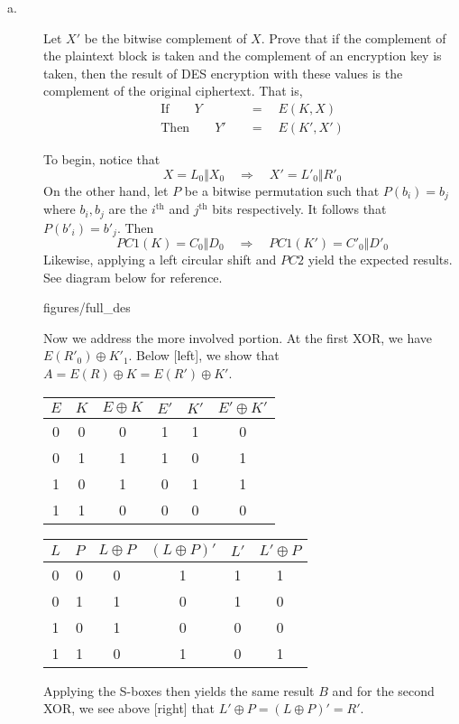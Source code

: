 \documentclass[../hw_sols.tex]{subfiles}
\begin{document}
\begin{description}

\item[a.] Let $X'$ be the bitwise complement of $X$. Prove that if the 
complement of the plaintext block is taken and the complement of an 
encryption key is taken, then the result of DES encryption with these values 
is the complement of the original ciphertext. That is,
\begin{align*}
	\text{If} \qquad Y \quad &= \quad E(K, X) \\
	\text{Then} \qquad Y' \quad &= \quad E(K', X')
\end{align*}

\begin{solution}

To begin, notice that 
	\[ X = L_0 \Vert X_0 \quad \Rightarrow \quad X' = L'_0 \Vert R'_0 \]
On the other hand, let $P$ be a bitwise permutation such that $P(b_i) = b_j$ 
where $b_i, b_j$ are the $i^{\text{th}}$ and $j^{\text{th}}$ bits 
respectively. It follows that $P(b'_i) = b'_j$. Then
	\[ PC1(K) = C_0 \Vert D_0 \quad 
	\Rightarrow 
	\quad PC1(K') = C'_0 \Vert D'_0 \]
Likewise, applying a left circular shift and $PC2$ yield the expected 
results. See diagram below for reference.
\begin{center}
	
		{figures/full_des}
\end{center}

Now we address the more involved portion. At the first XOR, we have 
$E(R'_0) \oplus K'_1$. Below [left], we show that 
$A = E(R) \oplus K = E(R') \oplus K'$.
\begin{center}
\begin{tabular}{ *{6}{ c } }
	$E$ & $K$ & $E \oplus K$ & $E'$ & $K'$ & $E' \oplus K'$ \\
	\hline
	0 & 0 & \cellcolor{yellow!75} 0 & 1 & 1 & \cellcolor{yellow!75} 0 \\
	0 & 1 & \cellcolor{yellow!75} 1 & 1 & 0 & \cellcolor{yellow!75} 1 \\
	1 & 0 & \cellcolor{yellow!75} 1 & 0 & 1 & \cellcolor{yellow!75} 1 \\
	1 & 1 & \cellcolor{yellow!75} 0 & 0 & 0 & \cellcolor{yellow!75} 0 
\end{tabular}
\hspace{1cm}
\begin{tabular}{ *{6}{ c } }
	$L$ & $P$ & $L \oplus P$ & $(L \oplus P)'$ & $L'$ & $L' \oplus P$ \\
	\hline
	0 & 0 & 0 & \cellcolor{yellow!75} 1 & 1 & \cellcolor{yellow!75} 1 \\
	0 & 1 & 1 & \cellcolor{yellow!75} 0 & 1 & \cellcolor{yellow!75} 0 \\
	1 & 0 & 1 & \cellcolor{yellow!75} 0 & 0 & \cellcolor{yellow!75} 0 \\
	1 & 1 & 0 & \cellcolor{yellow!75} 1 & 0 & \cellcolor{yellow!75} 1 
\end{tabular}
\end{center}
Applying the S-boxes then yields the same result $B$ and for the second XOR, 
we see above [right] that \newline $L' \oplus P = (L \oplus P)' = R'$.


\end{solution}
\end{description}
\end{document}
